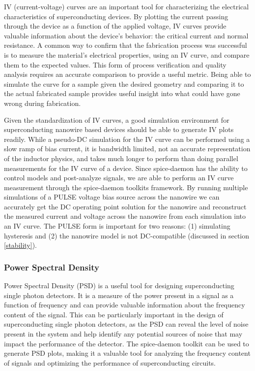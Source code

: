 \documentclass{article}
\begin{document}
IV (current-voltage) curves are an important tool for characterizing the electrical characteristics of superconducting 
devices. By plotting the current passing through the device as a function of the applied voltage, 
IV curves provide valuable information about the device's behavior: the critical current and normal resistance. A common 
way to confirm that the fabrication process was successful is to measure the material's electrical properties, using an IV curve, and compare them to the expected values. This form of process verification and quality analysis requires an accurate
comparison to provide a useful metric. Being able to simulate the curve for a sample given the desired geometry and comparing
it to the actual fabricated sample provides useful insight into what could have gone wrong during fabrication. 

Given the standardization of IV curves, a good simulation environment for superconducting nanowire based devices
should be able to generate IV plots readily. While a pseudo-DC simulation for the IV curve can be performed
using a slow ramp of bias current, it is bandwidth limited, not an accurate representation of the inductor physics, 
and takes much longer to perform than doing parallel measurements for the IV curve of a device. Since spice-daemon
has the ability to control models and post-analyze signals, we are able to perform an IV curve measurement through
the spice-daemon toolkits framework. By running multiple simulations of a PULSE voltage bias source across the nanowire
we can accurately get the DC operating point solution for the nanowire and reconstruct the measured current and voltage
across the nanowire from each simulation into an IV curve. The PULSE form is important for two reasons: (1) 
simulating hysteresis and (2) the nanowire model is not DC-compatible (discussed in section \ref{stability}).


\subsubsection{Power Spectral Density}

Power Spectral Density (PSD) is a useful tool for designing superconducting single photon detectors. It is a 
measure of the power present in a signal as a function of frequency and can provide valuable information about 
the frequency content of the signal. This can be particularly important in the design of superconducting 
single photon detectors, as the PSD can reveal the level of noise present in the system and help identify any 
potential sources of noise that may impact the performance of the detector. The spice-daemon toolkit can be used 
to generate PSD plots, making it a valuable tool for analyzing the frequency content of signals and optimizing 
the performance of superconducting circuits.
\end{document}
